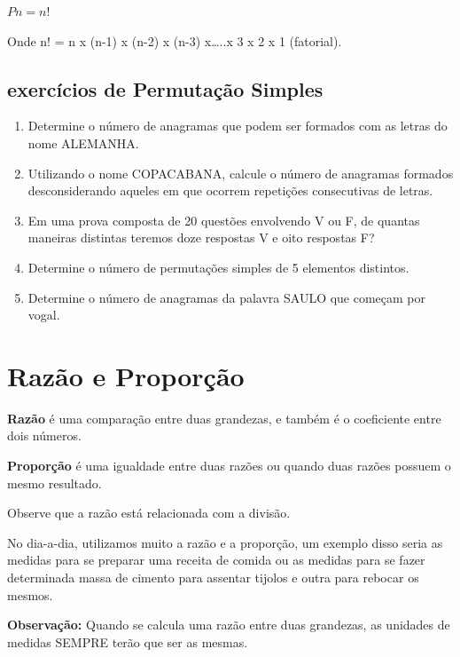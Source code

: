 \begin{multicols*}{2}
	{$Pn = n!$}

	Onde n! = n x (n-1) x (n-2)  x (n-3) x…..x 3 x 2 x 1 (fatorial).

	\subsection*{exercícios de Permutação Simples}

	\begin{enumerate}[wide, labelwidth=!, labelindent=0pt]

		\item Determine o número de anagramas que podem ser formados com as letras do nome ALEMANHA.

		\item Utilizando o nome COPACABANA, calcule o número de anagramas formados desconsiderando aqueles em que ocorrem repetições consecutivas de letras.

		\item Em uma prova composta de 20 questões envolvendo V ou F, de quantas maneiras distintas teremos doze respostas V e oito respostas F?

		\item Determine o número de permutações simples de 5 elementos distintos.

		\item Determine o número de anagramas da palavra SAULO que começam por vogal.

	\end{enumerate}

	\section*{Razão e Proporção}

	\textbf{Razão} é uma comparação entre duas grandezas, e também é o coeficiente entre dois números.

	\textbf{Proporção} é uma igualdade entre duas razões ou quando duas razões possuem o mesmo resultado.

	Observe que a razão está relacionada com a divisão.

	No dia-a-dia, utilizamos muito a razão e a proporção, um exemplo disso seria as medidas para se preparar uma receita de comida ou as medidas para se fazer determinada massa de cimento para assentar tijolos e outra para rebocar os mesmos.

	\textbf{Observação:} Quando se calcula uma razão entre duas grandezas, as unidades de medidas SEMPRE terão que ser as mesmas.


\end{multicols*}
